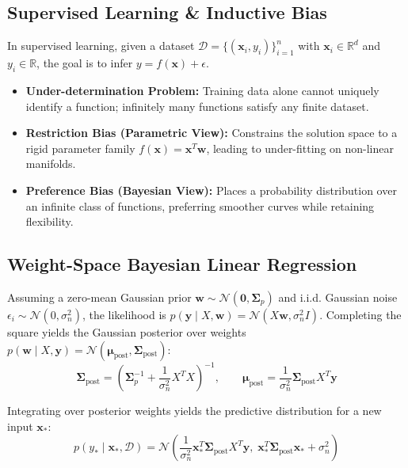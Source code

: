 \documentclass[11pt,a4paper]{article}
\begin{document}
\subsection{Supervised Learning \& Inductive Bias}
In supervised learning, given a dataset $\mathcal{D} = \{(\mathbf{x}_i, y_i)\}_{i=1}^n$ with $\mathbf{x}_i \in \mathbb{R}^d$ and $y_i \in \mathbb{R}$, the goal is to infer $y = f(\mathbf{x}) + \epsilon$. 
\begin{itemize}
  \item \textbf{Under-determination Problem:} Training data alone cannot uniquely identify a function; infinitely many functions satisfy any finite dataset.
  \item \textbf{Restriction Bias (Parametric View):} Constrains the solution space to a rigid parameter family $f(\mathbf{x}) = \mathbf{x}^T \mathbf{w}$, leading to under-fitting on non-linear manifolds.
  \item \textbf{Preference Bias (Bayesian View):} Places a probability distribution over an infinite class of functions, preferring smoother curves while retaining flexibility.
\end{itemize}

\subsection{Weight-Space Bayesian Linear Regression}
Assuming a zero-mean Gaussian prior $\mathbf{w} \sim \mathcal{N}(\mathbf{0}, \boldsymbol{\Sigma}_p)$ and i.i.d. Gaussian noise $\epsilon_i \sim \mathcal{N}(0, \sigma_n^2)$, the likelihood is $p(\mathbf{y} \mid X, \mathbf{w}) = \mathcal{N}(X\mathbf{w}, \sigma_n^2 I)$. Completing the square yields the Gaussian posterior over weights $p(\mathbf{w} \mid X, \mathbf{y}) = \mathcal{N}(\boldsymbol{\mu}_{\text{post}}, \boldsymbol{\Sigma}_{\text{post}})$:
\begin{equation}
  \boldsymbol{\Sigma}_{\text{post}} = \left(\boldsymbol{\Sigma}_p^{-1} + \frac{1}{\sigma_n^2} X^T X\right)^{-1}, \qquad \boldsymbol{\mu}_{\text{post}} = \frac{1}{\sigma_n^2} \boldsymbol{\Sigma}_{\text{post}} X^T \mathbf{y}
\end{equation}

Integrating over posterior weights yields the predictive distribution for a new input $\mathbf{x}_*$:
\begin{equation}
  p(y_* \mid \mathbf{x}_*, \mathcal{D}) = \mathcal{N}\left(\frac{1}{\sigma_n^2} \mathbf{x}_*^T \boldsymbol{\Sigma}_{\text{post}} X^T \mathbf{y}, \; \mathbf{x}_*^T \boldsymbol{\Sigma}_{\text{post}} \mathbf{x}_* + \sigma_n^2\right)
\end{equation}
\end{document}

